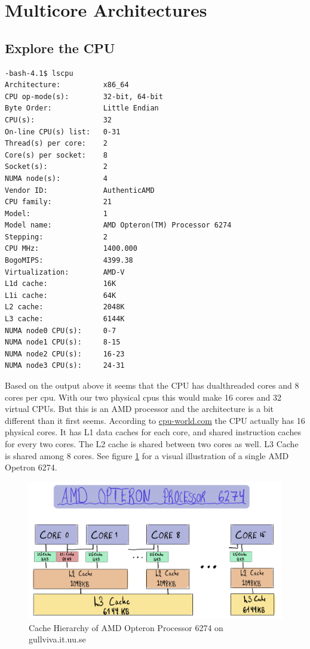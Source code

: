 \section{Multicore Architectures}

\subsection{Explore the CPU}

\begin{lstlisting}[caption=Output from lscpu command]
-bash-4.1$ lscpu
Architecture:          x86_64
CPU op-mode(s):        32-bit, 64-bit
Byte Order:            Little Endian
CPU(s):                32
On-line CPU(s) list:   0-31
Thread(s) per core:    2
Core(s) per socket:    8
Socket(s):             2
NUMA node(s):          4
Vendor ID:             AuthenticAMD
CPU family:            21
Model:                 1
Model name:            AMD Opteron(TM) Processor 6274
Stepping:              2
CPU MHz:               1400.000
BogoMIPS:              4399.38
Virtualization:        AMD-V
L1d cache:             16K
L1i cache:             64K
L2 cache:              2048K
L3 cache:              6144K
NUMA node0 CPU(s):     0-7
NUMA node1 CPU(s):     8-15
NUMA node2 CPU(s):     16-23
NUMA node3 CPU(s):     24-31
\end{lstlisting}

Based on the output above it seems that the CPU has dualthreaded cores and 8 
cores per cpu. With our two physical cpus this would make 16 cores and 32 virtual
CPUs. But this is an AMD processor and the architecture is a bit different than
it first seems. According to \href{https://www.cpu-world.com/CPUs/Bulldozer/AMD-Opteron%206274%20OS6274WKTGGGU.html}{cpu-world.com}
the CPU actually has 16 physical cores. It has L1 data caches for each core, and 
shared instruction caches for every two cores. The L2 cache is shared between 
two cores as well. L3 Cache is shared among 8 cores. See figure \ref{fig:amd}
for a visual illustration of a single AMD Opetron 6274.

\begin{figure}[!h]
    \centering
    \includegraphics[width=\linewidth]{Figures/datahierarchy.PNG}
    \caption{Cache Hierarchy of AMD Opteron Processor 6274 on gullviva.it.uu.se}
    \label{fig:amd}
\end{figure}

